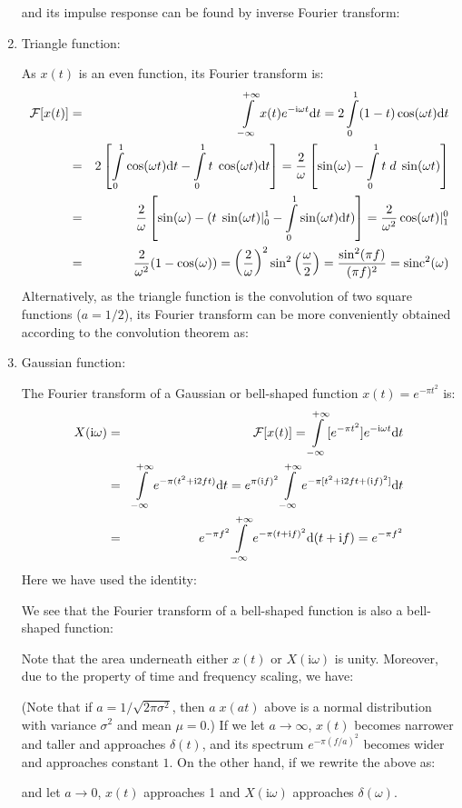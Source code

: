 \begin{enumerate}
	and its impulse response can be found by inverse Fourier transform:
	
	
	\item Triangle function:
	
	As $x(t)$ is an even function, its Fourier transform is:
	\begin{eqnarray}
	{\cal F}[x(t)]&=&\int\limits_{-\infty}^{+\infty} x(t)e^{-\mathrm{i}\omega t}\mathrm{d}t
		=2\int\limits_0^1(1-t)\cos(\omega t) \mathrm{d}t
		\nonumber \\
	&=&2\left[\int\limits_0^1 \cos(\omega t) \mathrm{d}t-\int\limits_0^1 t\;\cos(\omega t) \mathrm{d}t\right]
	=\frac{2}{\omega}\left[\sin(\omega)-\int\limits_0^1 t\;d\;\sin(\omega t)\right]
		\nonumber \\
	&=&\frac{2}{\omega}\left[\sin(\omega)-(t\;\sin(\omega t)|_0^1-\int\limits_0^1\sin(\omega t)\mathrm{d}t)\right]
	=\frac{2}{\omega^2}\cos(\omega t)|_1^0
		\nonumber \\
	&=&\frac{2}{\omega^2}(1-\cos(\omega))
	=\left(\frac{2}{\omega}\right)^2\sin^2\left(\frac{\omega}{2}\right)
	=\frac{\sin^2(\pi f)}{(\pi f)^2}=\mathrm{sinc}^2(\omega)
		\nonumber
	\end{eqnarray}
	Alternatively, as the triangle function is the convolution of two square functions
	($a=1/2$), its Fourier transform can be more conveniently obtained according to the
	convolution theorem as: 
	
	
	\item Gaussian function:
	
	The Fourier transform of a Gaussian or bell-shaped function $x(t)=e^{-\pi t^2}$ is:
	\begin{eqnarray}
	X(\mathrm{i}\omega)&=&{\cal F}[x(t)]=\int\limits_{-\infty}^{+\infty} [e^{-\pi t^2}]e^{-\mathrm{i}\omega t}\mathrm{d}t
		\nonumber \\
	 &=& \int\limits_{-\infty}^{+\infty} e^{-\pi(t^2+\mathrm{i}2ft)} \mathrm{d}t
		=e^{\pi(\mathrm{i}f)^2}\int\limits_{-\infty}^{+\infty} e^{-\pi[t^2+\mathrm{i}2ft+(\mathrm{i}f)^2]} \mathrm{d}t
		\nonumber \\
	 &=& e^{-\pi f^2}\int\limits_{-\infty}^{+\infty} e^{-\pi(t+\mathrm{i}f)^2} \mathrm{d}(t+\mathrm{i}f)=e^{-\pi f^2}
		\nonumber 
	\end{eqnarray}
	Here we have used the identity:
	
	We see that the Fourier transform of a bell-shaped function is also a bell-shaped function:
	
	Note that the area underneath either $x(t)$ or $X(\mathrm{i}\omega)$ is unity. Moreover, due to the property of time and frequency scaling, we have:
	
	(Note that if $a=1/\sqrt{2\pi \sigma^2}$, then $a\;x(at)$ above is a normal 	distribution with variance $\sigma^2$ and mean $\mu=0$.) If we let $a \rightarrow \infty$, $x(t)$ becomes narrower and taller and  approaches $\delta(t)$, and its spectrum $e^{-\pi (f/a)^2}$ becomes wider and approaches constant $1$. On the other hand, if we rewrite the above as:
	
	and let $a \rightarrow 0$, $x(t)$ approaches 1 and $X(\mathrm{i}\omega)$ approaches 
	$\delta(\omega)$.
	
	\end{enumerate}
	
